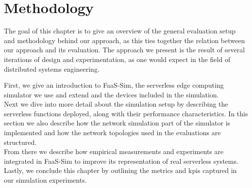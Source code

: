 \chapter{Methodology}
The goal of this chapter is to give an overview of the general evaluation setup and methodology behind our approach, as this ties together the relation between our approach and its evaluation.
The approach we present is the result of several iterations of design and experimentation, as one would expect in the field of distributed systems engineering.

First, we give an introduction to FaaS-Sim, the serverless edge computing simulator we use and extend and the devices included in the simulation.\\
Next we dive into more detail about the simulation setup by describing the serverless functions deployed, along with their performance characteristics.
In this section we also describe how the network simulation part of the simulator is implemented and how the network topologies used in the evaluations are structured.\\
From there we describe how empirical measurements and experiments are integrated in FaaS-Sim to improve its representation of real serverless systems.\\
Lastly, we conclude this chapter by outlining the metrics and \glspl{kpi} captured in our simulation experiments.




